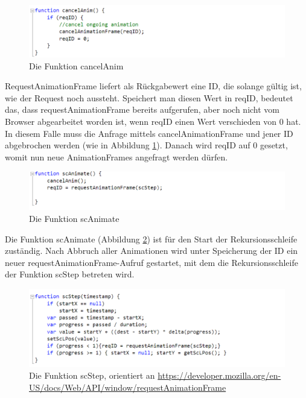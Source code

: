 \begin{figure} [h]
\includegraphics[width=\textwidth]{./img/js_cancelanim.png}
\caption{Die Funktion cancelAnim}
\label{js_cancelanim}
\end{figure}

RequestAnimationFrame liefert als Rückgabewert eine ID, die solange gültig ist, wie der Request noch aussteht. Speichert man diesen Wert in reqID, bedeutet das, dass requestAnimationFrame bereits aufgerufen, aber noch nicht vom Browser abgearbeitet worden ist, wenn reqID einen Wert verschieden von 0 hat. In diesem Falle muss die Anfrage mittels cancelAnimationFrame und jener ID abgebrochen werden (wie in Abbildung \ref{js_cancelanim}). Danach wird reqID auf 0 gesetzt, womit nun neue AnimationFrames angefragt werden dürfen.

\begin{figure} [h]
\includegraphics[width=\textwidth]{./img/js_scanim.png}
\caption{Die Funktion scAnimate}
\label{js_scanim}
\end{figure}

Die Funktion scAnimate (Abbildung \ref{js_scanim}) ist für den Start der Rekursionsschleife zuständig. Nach Abbruch aller Animationen wird unter Speicherung der ID ein neuer requestAnimationFrame-Aufruf gestartet, mit dem die Rekursionsschleife der Funktion scStep betreten wird.

\begin{figure} [h]
\includegraphics[width=\textwidth]{./img/js_scstep.png}
\caption{Die Funktion scStep, orientiert an \url{https://developer.mozilla.org/en-US/docs/Web/API/window/requestAnimationFrame}}
\label{js_scstep}
\end{figure}

